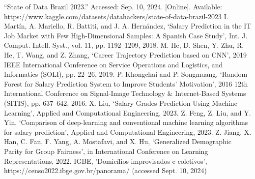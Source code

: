 \documentclass[conference]{IEEEtran}
\begin{document}
\begin{thebibliography}{00}
 “State of Data Brazil 2023.” Accessed: Sep. 10, 2024. [Online]. Available: https://www.kaggle.com/datasets/datahackers/state-of-data-brazil-2023
 I. Martín, A. Mariello, R. Battiti, and J. A. Hernández, ‘Salary Prediction in the IT Job Market with Few High-Dimensional Samples: A Spanish Case Study’, Int. J. Comput. Intell. Syst., vol. 11, pp. 1192–1209, 2018.
 M. He, D. Shen, Y. Zhu, R. He, T. Wang, and Z. Zhang, ‘Career Trajectory Prediction based on CNN’, 2019 IEEE International Conference on Service Operations and Logistics, and Informatics (SOLI), pp. 22–26, 2019.
 P. Khongchai and P. Songmuang, ‘Random Forest for Salary Prediction System to Improve Students’ Motivation’, 2016 12th International Conference on Signal-Image Technology \& Internet-Based Systems (SITIS), pp. 637–642, 2016.
 X. Liu, ‘Salary Grades Prediction Using Machine Learning’, Applied and Computational Engineering, 2023.
 Z. Feng, Z. Liu, and Y. Yin, ‘Comparison of deep-learning and conventional machine learning algorithms for salary prediction’, Applied and Computational Engineering, 2023.
 Z. Jiang, X. Han, C. Fan, F. Yang, A. Mostafavi, and X. Hu, ‘Generalized Demographic Parity for Group Fairness’, in International Conference on Learning Representations, 2022.
 IGBE, 'Domicílios improvisados e coletivos', https://censo2022.ibge.gov.br/panorama/ (accessed Sept. 10, 2024)
\end{thebibliography}
\end{document}
